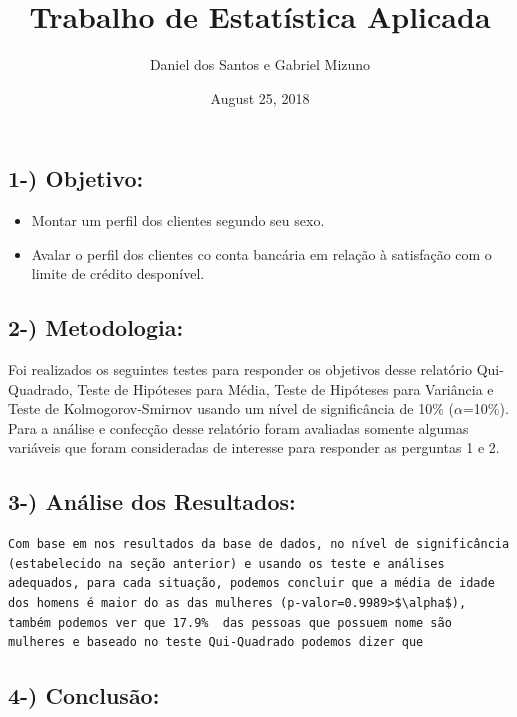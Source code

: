 \documentclass[]{article}
\title{Trabalho de Estatística Aplicada}
\author{Daniel dos Santos e Gabriel Mizuno}
\date{August 25, 2018}
\providecommand{\tightlist}{%
  \setlength{\itemsep}{0pt}\setlength{\parskip}{0pt}}
\begin{document}
\maketitle

{
\setcounter{tocdepth}{1}
\tableofcontents
}
\subsection{1-) Objetivo:}\label{objetivo}

\begin{itemize}
\tightlist
\item
  Montar um perfil dos clientes segundo seu sexo.\\
\item
  Avalar o perfil dos clientes co conta bancária em relação à satisfação
  com o limite de crédito desponível.
\end{itemize}

\subsection{2-) Metodologia:}\label{metodologia}

Foi realizados os seguintes testes para responder os objetivos desse
relatório Qui-Quadrado, Teste de Hipóteses para Média, Teste de
Hipóteses para Variância e Teste de Kolmogorov-Smirnov usando um nível
de significância de 10\% (\(\alpha\)=10\%). Para a análise e confecção
desse relatório foram avaliadas somente algumas variáveis que foram
consideradas de interesse para responder as perguntas 1 e 2.

\subsection{3-) Análise dos Resultados:}\label{analise-dos-resultados}

\begin{verbatim}
Com base em nos resultados da base de dados, no nível de significância (estabelecido na seção anterior) e usando os teste e análises adequados, para cada situação, podemos concluir que a média de idade dos homens é maior do as das mulheres (p-valor=0.9989>$\alpha$), também podemos ver que 17.9%  das pessoas que possuem nome são mulheres e baseado no teste Qui-Quadrado podemos dizer que 
\end{verbatim}

\subsection{4-) Conclusão:}\label{conclusao}
\end{document}

